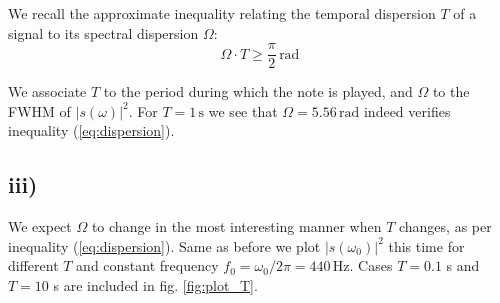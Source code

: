 \documentclass{article}
\begin{document}
We recall the approximate inequality relating the temporal dispersion $T$ of a signal to its spectral dispersion $\Omega$:
\begin{equation}
    \Omega \cdot T \ge \frac{\pi}{2} \,\si{\radian}
    \label{eq:dispersion}
\end{equation}

We associate $T$ to the period during which the note is played, and $\Omega$ to the FWHM of $|s(\omega)|^2$. For $T = 1 \,\si{\s}$ we see that $\Omega = 5.56 \,\si{\radian}$ indeed verifies inequality (\ref{eq:dispersion}).

\subsection*{iii)}
We expect $\Omega$ to change in the most interesting manner when $T$ changes, as per inequality (\ref{eq:dispersion}). 
Same as before we plot $|s(\omega_0)|^2$ this time for different $T$ and constant frequency $f_0 = \omega_0/2\pi = 440 \,\si{\Hz}$. Cases $T=0.1$ s and $T=10$ s are included in fig. \ref{fig:plot_T}.
\end{document}
